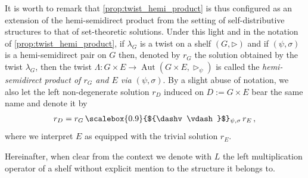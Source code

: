 \documentclass[preprint,1p]{elsarticle}
\numberwithin{equation}{section}
\theoremstyle{definition}               %
\newcommand{\vd}{\vdash}
\newcommand{\dv}{\dashv}
\newcommand{\tr}{\triangleright}
\DeclareMathOperator{\Aut}{Aut}
\begin{document}
It is worth to remark that \cref{prop:twist_hemi_product} is thus configured as an extension of the hemi-semidirect product from the setting of self-distributive structures to that of set-theoretic solutions.
Under this light and in the notation of \cref{prop:twist_hemi_product}, if $\lambda_G$ is a twist on a shelf $(G,\triangleright)$ and if $(\psi,\sigma)$ is a hemi-semidirect pair on $G$ then, denoted by $r_G$ the solution obtained by the twist $\lambda_G$, then the twist ${\Lambda}:G \times E \to \Aut(G \times E, \tr_{\psi})$ is called the \emph{hemi-semidirect product of $r_G$ and $E$ via $(\psi,\sigma)$}.
By a slight abuse of notation, we also let the left non-degenerate solution $r_D$ induced on $D := G \times E$ bear the same name and denote it by 
\begin{align*}
    r_D = r_G\, \text{\scalebox{0.9}{${\dv\vd}$}$_{\psi,\sigma}$}\, r_E \,,
\end{align*}
where we interpret $E$ as equipped with the trivial solution $r_E$.

\medskip

Hereinafter, when clear from the context we denote with $L$ the left multiplication operator of a shelf without explicit mention to the structure it belongs to.
\end{document}
